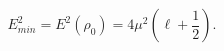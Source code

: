 \begin{equation}                              
E_{min}^{2} = E^{2} (\rho_{0}) = 4 \mu^{2} (\ell+\frac{1}{2}).                       \label{eq:min}       
\end{equation} 
